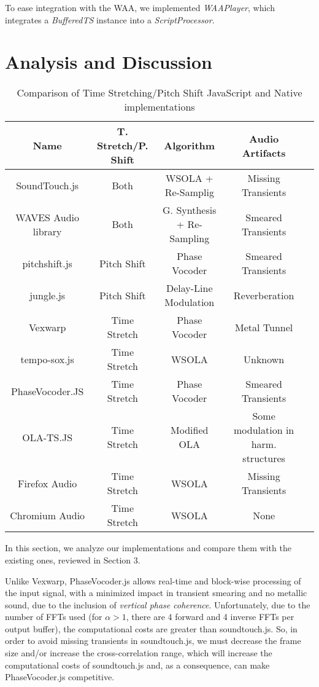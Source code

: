 \documentclass{sig-alternate}
\begin{document}
\begin{sloppypar}
To ease integration with the WAA, we implemented \textit{WAAPlayer}, which integrates a \textit{BufferedTS} instance into a \textit{ScriptProcessor}.





\section{Analysis and Discussion}

\begin{table*}
	\centering
	\caption{Comparison of Time Stretching/Pitch Shift JavaScript and Native implementations}
	\begin{tabular}{|c|c|c|c|c|} \hline
	\textbf{Name}			& \textbf{T. Stretch/P. Shift}	&\textbf{Algorithm}		& \textbf{Audio Artifacts}\\ \hline
	SoundTouch.js 			& Both 					& WSOLA + Re-Samplig		& Missing Transients \\ \hline
	WAVES Audio library		& Both					& G. Synthesis + Re-Sampling	& Smeared Transients \\ \hline
	pitchshift.js				& Pitch Shift				& Phase Vocoder 			& Smeared Transients \\ \hline
	jungle.js					& Pitch Shift				& Delay-Line Modulation	& Reverberation \\ \hline
	Vexwarp					& Time Stretch			& Phase Vocoder 			& Metal Tunnel \\ \hline
	tempo-sox.js				& Time Stretch			& WSOLA					& Unknown \\ \hline
	PhaseVocoder.JS 			& Time Stretch			& Phase Vocoder 			& Smeared Transients \\ \hline
	OLA-TS.JS 				& Time Stretch			& Modified OLA			& Some modulation in harm. structures \\ \hline
	Firefox Audio		& Time Stretch			& WSOLA 				& Missing Transients \\ \hline
	Chromium Audio 	& Time Stretch			& WSOLA 				& None \\
	\hline\end{tabular}
\end{table*}

In this section, we analyze our implementations and compare them with the existing ones, reviewed in Section 3.
\begin{sloppypar}
Unlike Vexwarp, PhaseVocoder.js allows real-time and block-wise processing of the input signal, with a minimized impact in transient smearing and no metallic sound, due to the inclusion of \textit{vertical phase coherence}. Unfortunately, due to the number of FFTs used (for $\alpha>1$, there are 4 forward and 4 inverse FFTs per output buffer), the computational costs are greater than soundtouch.js. So, in order to avoid missing transients in soundtouch.js, we must decrease the frame size and/or increase the cross-correlation range, which will increase the computational costs of soundtouch.js and, as a consequence, can make PhaseVocoder.js competitive.
\end{sloppypar}


\end{sloppypar}
\end{document}
